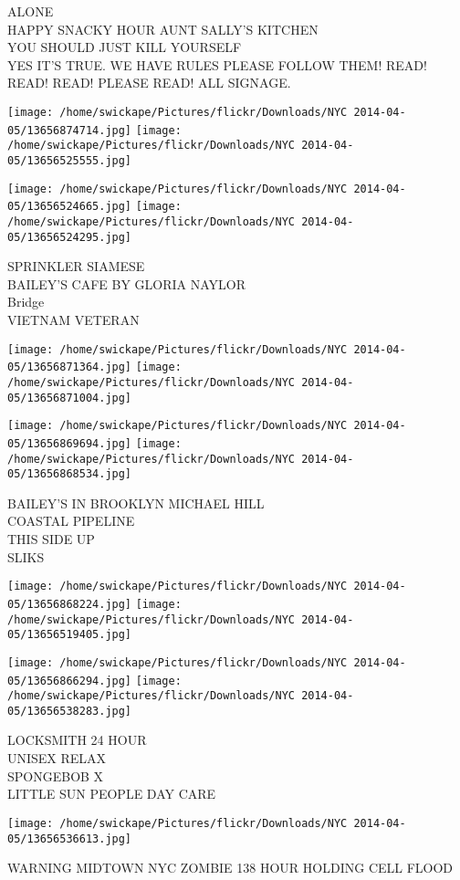 \documentclass[10pt,letterpaper]{article}
\begin{document}
ALONE\\
HAPPY SNACKY HOUR AUNT SALLY'S KITCHEN\\
YOU SHOULD JUST KILL YOURSELF\\
YES IT'S TRUE.  WE HAVE RULES PLEASE FOLLOW THEM!  READ! READ! READ! PLEASE READ! ALL SIGNAGE.
\pagebreak

\texttt{[image: /home/swickape/Pictures/flickr/Downloads/NYC 2014-04-05/13656874714.jpg]}
\texttt{[image: /home/swickape/Pictures/flickr/Downloads/NYC 2014-04-05/13656525555.jpg]}

\texttt{[image: /home/swickape/Pictures/flickr/Downloads/NYC 2014-04-05/13656524665.jpg]}
\texttt{[image: /home/swickape/Pictures/flickr/Downloads/NYC 2014-04-05/13656524295.jpg]}

SPRINKLER SIAMESE\\
BAILEY'S CAFE BY GLORIA NAYLOR\\
Bridge\\
VIETNAM VETERAN
\pagebreak

\texttt{[image: /home/swickape/Pictures/flickr/Downloads/NYC 2014-04-05/13656871364.jpg]}
\texttt{[image: /home/swickape/Pictures/flickr/Downloads/NYC 2014-04-05/13656871004.jpg]}

\texttt{[image: /home/swickape/Pictures/flickr/Downloads/NYC 2014-04-05/13656869694.jpg]}
\texttt{[image: /home/swickape/Pictures/flickr/Downloads/NYC 2014-04-05/13656868534.jpg]}

BAILEY'S IN BROOKLYN MICHAEL HILL\\
COASTAL PIPELINE\\
THIS SIDE UP\\
SLIKS
\pagebreak

\texttt{[image: /home/swickape/Pictures/flickr/Downloads/NYC 2014-04-05/13656868224.jpg]}
\texttt{[image: /home/swickape/Pictures/flickr/Downloads/NYC 2014-04-05/13656519405.jpg]}

\texttt{[image: /home/swickape/Pictures/flickr/Downloads/NYC 2014-04-05/13656866294.jpg]}
\texttt{[image: /home/swickape/Pictures/flickr/Downloads/NYC 2014-04-05/13656538283.jpg]}

LOCKSMITH 24 HOUR\\
UNISEX RELAX\\
SPONGEBOB X\\
LITTLE SUN PEOPLE DAY CARE
\pagebreak

\texttt{[image: /home/swickape/Pictures/flickr/Downloads/NYC 2014-04-05/13656536613.jpg]}

WARNING MIDTOWN NYC ZOMBIE 138 HOUR HOLDING CELL FLOOD
\pagebreak
\end{document}
